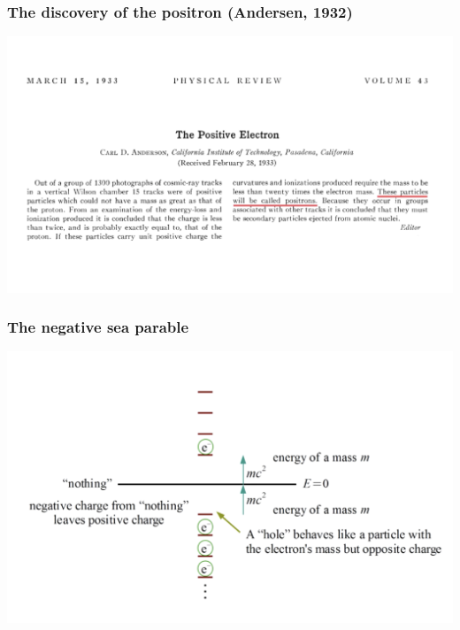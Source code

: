 \begin{frame}
\frametitle{The discovery of the positron (Andersen, 1932)}

\includegraphics[scale=0.3]{img/AndersonPaper.png}
\end{frame}

%
%

\begin{frame}
\frametitle{The negative sea parable}

\includegraphics[scale=0.3]{img/negativeSea.png}
\end{frame}

%
%
%
%
%






